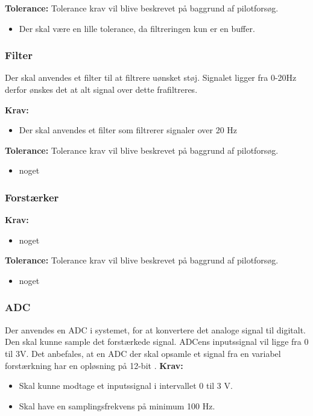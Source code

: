 \textbf{Tolerance:}
Tolerance krav vil blive beskrevet på baggrund af pilotforsøg.
\begin{itemize}
\item Der skal være en lille tolerance, da filtreringen kun er en buffer. 
\end{itemize}

\subsubsection{Filter}
Der skal anvendes et filter til at filtrere uønsket støj. Signalet ligger fra 0-20Hz derfor ønskes det at alt signal over dette frafiltreres. 

\textbf{Krav:}
\begin{itemize}
\item Der skal anvendes et filter som filtrerer signaler over 20 Hz
\end{itemize}

\textbf{Tolerance:}
Tolerance krav vil blive beskrevet på baggrund af pilotforsøg.
\begin{itemize}
\item noget
\end{itemize}

\subsubsection{Forstærker}
\textbf{Krav:}
\begin{itemize}
\item noget
\end{itemize}

\textbf{Tolerance:}
Tolerance krav vil blive beskrevet på baggrund af pilotforsøg.
\begin{itemize}
\item noget
\end{itemize}

\subsubsection{ADC}
Der anvendes en ADC i systemet, for at konvertere det analoge signal til digitalt. Den skal kunne sample det forstærkede signal. ADCens inputssignal vil ligge fra 0 til 3V. Det anbefales, at en ADC der skal opsamle et signal fra en variabel forstærkning har en opløsning på 12-bit \cite{Zouridakis2003}.
\textbf{Krav:}
\begin{itemize}
\item Skal kunne modtage et inputssignal i intervallet 0 til 3 V.
\item Skal have en samplingsfrekvens på minimum 100 Hz. 
\end{itemize}

